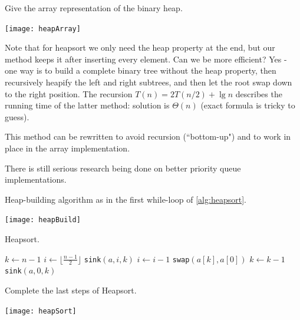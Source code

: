 \begin{Boxample}[0]
Give the array representation of the binary heap.
\begin{center}
\texttt{[image: heapArray]}
\end{center}
\end{Boxample}

Note that for heapsort we only need the heap property at the end, but our method keeps it after inserting every element. 
Can we be more efficient? Yes - one way is to build a complete binary tree without the heap property, then
recursively heapify the left and right subtrees, and then let the root swap 
down to the right position. The recursion $T(n) = 2T(n/2) + \lg n$ describes the running time of the 
latter method: solution is $\Theta(n)$ (exact formula is tricky to guess).
 
This method can be rewritten to avoid recursion (``bottom-up") and to work 
in place in the array implementation. 

There is still serious research being done on better priority queue implementations.

\begin{Boxample}\label{ex:heapbuild}
Heap-building algorithm as in the first while-loop of \cref{alg:heapsort}.
\begin{center}
\texttt{[image: heapBuild]}
\end{center}
\end{Boxample}

\begin{algorithm}[H]
  \caption{Heapsort.}
  \label{alg:heapsort}
\begin{algorithmic}[1]
\State $k \gets n-1$ 
\State $i \gets \lfloor \frac{n-1}{2} \rfloor $
	\State \texttt{sink}$(a, i, k)$ 
	\State $i\gets i - 1$
\EndWhile {}
	\State \texttt{swap}$(a[k], a[0])$
	\State $k \gets k - 1$
	\State \texttt{sink}$(a, 0, k)$ 
\EndWhile
\State {}
\EndFunction  
\end{algorithmic}
\end{algorithm}

\begin{Boxample}[0] Complete the last steps of Heapsort.
\begin{center}
\texttt{[image: heapSort]}
\end{center}
\end{Boxample}

